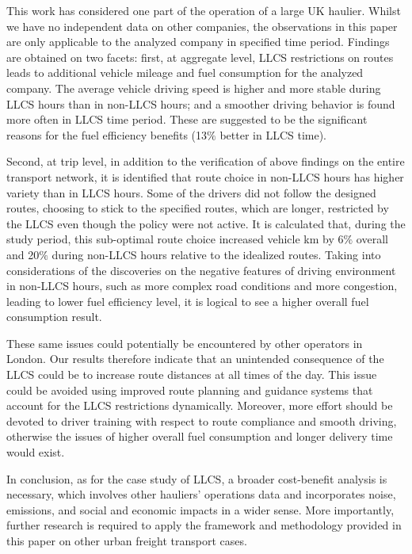\documentclass[preprint,12pt,3p]{elsarticle}
\begin{document}
This work has considered one part of the operation of a large UK haulier. Whilst we have no independent data on other companies, the observations in this paper are only applicable to the analyzed company in specified time period. Findings are obtained on two facets: first, at aggregate level, LLCS restrictions on routes leads to additional vehicle mileage and fuel consumption for the analyzed company. The average vehicle driving speed is higher and more stable during LLCS hours than in non-LLCS hours; and a smoother driving behavior is found more often in LLCS time period. These are suggested to be the significant reasons for the fuel efficiency benefits (13$\%$ better in LLCS time).

Second, at trip level, in addition to the verification of above findings on the entire transport network, it is identified that route choice in non-LLCS hours has higher variety than in LLCS hours. Some of the drivers did not follow the designed routes, choosing to stick to the specified routes, which are longer, restricted by the LLCS even though the policy were not active. It is calculated that, during the study period, this sub-optimal route choice increased vehicle km by 6$\%$ overall and 20$\%$ during non-LLCS hours relative to the idealized routes. Taking into considerations of the discoveries on the negative features of driving environment in non-LLCS hours, such as more complex road conditions and more congestion, leading to lower fuel efficiency level, it is logical to see a higher overall fuel consumption result.

These same issues could potentially be encountered by other operators in London. Our results therefore indicate that an unintended consequence of the LLCS could be to increase route distances at all times of the day. This issue could be avoided using improved route planning and guidance systems that account for the LLCS restrictions dynamically. Moreover, more effort should be devoted to driver training with respect to route compliance and smooth driving, otherwise the issues of higher overall fuel consumption and longer delivery time would exist.


In conclusion, as for the case study of LLCS, a broader cost-benefit analysis is necessary, which involves other hauliers' operations data and incorporates noise, emissions, and social and economic impacts in a wider sense. More importantly, further research is required to apply the framework and methodology provided in this paper on other urban freight transport cases. 
\end{document}
